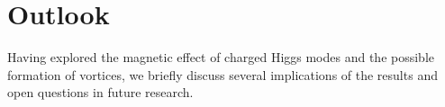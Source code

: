 \documentclass[12pt]{article}
\begin{document}
\vspace{2.8cm}

\section{\bf Outlook}\label{sec:4}
\vspace{0.2cm}

Having explored the magnetic effect of charged Higgs modes and the possible formation of vortices, we briefly discuss several implications of the results and open questions in future research.
 
\end{document}
